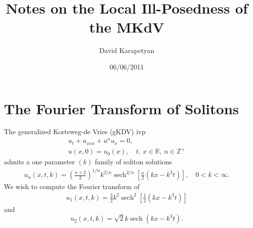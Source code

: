 \documentclass[12pt,reqno]{amsart}
\numberwithin{equation}{section}  %
\newcommand{\rr}{\mathbb{R}}
\newcommand{\zz}{\mathbb{Z}}
\DeclareMathOperator{\sech}{sech}
\begin{document}
\title{Notes on the Local Ill-Posedness of the MKdV}
\author{David Karapetyan}
\address{Department of Mathematics  \\
    University  of Notre Dame\\
        Notre Dame, IN 46556 }
        \date{06/06/2011}
        \maketitle
        \section{The Fourier Transform of Solitons}
        \label{sec:comps}

        The generalized Korteweg-de Vries (gKDV) ivp
        \begin{gather*}
          u_{t} + u_{xxx} + u^{n}u_{x} = 0, 
          \\
          u(x,0) = u_{0}(x), \quad t, \ x \in \rr, \ n \in \zz^{+}
        \end{gather*}
        admits a one parameter $(k)$ family of soliton solutions
        \begin{equation*}
        \begin{split}
          u_{n}(x,t,k) = \left( \frac{n+2}{2} \right)^{1/n} k^{2/n}
          \sech^{2/n}\left[ \frac{n}{2}(kx - k^{3}t) \right], \quad 0 < k <
          \infty.
        \end{split}
        \end{equation*}
        We wish to compute the Fourier transform of 
        \begin{equation}
          \label{kdv-soliton}
          \begin{split}
            u_{1}(x, t, k) =
        \frac{3}{2} k^{2} \sech^{2}\left[ \frac{1}{2}(kx - k^{3}t)
        \right]
      \end{split}
    \end{equation}
    and 
        \begin{equation}
          \label{mkdv-soliton}
            u_{2}(x, t, k) = \sqrt{2} k \sech\left( kx -
        k^{3}t \right).
      \end{equation}
                
\end{document}
